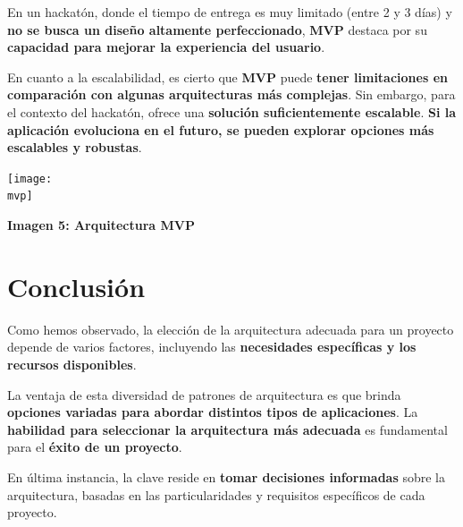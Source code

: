 \documentclass[a4paper]{article}
\newcommand{\mvp}{imagenes/mvp.png}
\begin{document}
    En un hackatón, donde el tiempo de entrega es muy limitado (entre 2 y 3 días) y \textbf{no se busca un diseño altamente perfeccionado}, \textbf{MVP} destaca por su \textbf{capacidad para mejorar la experiencia del usuario}.\vspace{0.3cm}
    
    En cuanto a la escalabilidad, es cierto que \textbf{MVP} puede \textbf{tener limitaciones en comparación con algunas arquitecturas más complejas}. Sin embargo, para el contexto del hackatón, ofrece una \textbf{solución suficientemente escalable}. \textbf{Si la aplicación evoluciona en el futuro, se pueden explorar opciones más escalables y robustas}.\vspace{0.3cm}
    
    \begin{center}
        \texttt{[image: \\mvp]}\vspace{0.2cm}\par
        \textbf{Imagen 5: Arquitectura MVP}
    \end{center}

    \section{Conclusión}
    Como hemos observado, la elección de la arquitectura adecuada para un proyecto depende de varios factores, incluyendo las \textbf{necesidades específicas y los recursos disponibles}.\vspace{0.3cm}

    La ventaja de esta diversidad de patrones de arquitectura es que brinda \textbf{opciones variadas para abordar distintos tipos de aplicaciones}. La \textbf{habilidad para seleccionar la arquitectura más adecuada} es fundamental para el \textbf{éxito de un proyecto}.\vspace{0.3cm}
    
    En última instancia, la clave reside en \textbf{tomar decisiones informadas} sobre la arquitectura, basadas en las particularidades y requisitos específicos de cada proyecto.\vspace{0.3cm}
        
    \renewcommand{\refname}{4.\hspace{0.6cm}Bibliografía}
    
\end{document}
